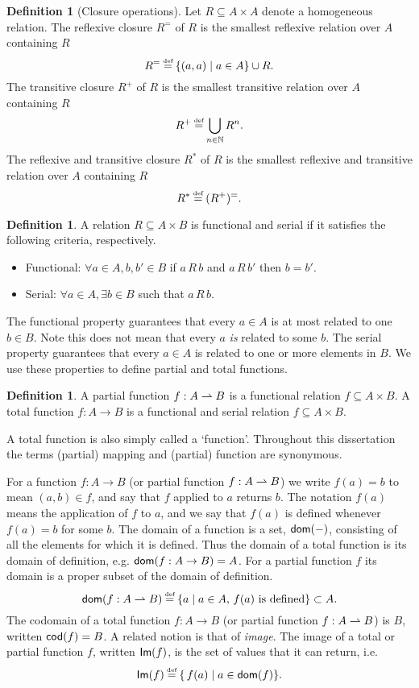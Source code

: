 \documentclass[12pt,phd,lfcs,twoside,openright,logo,leftchapter,normalheadings]{infthesis}
\theoremstyle{plain}
\theoremstyle{definition}
\newtheorem{definition}[theorem]{Definition}
\begin{document}
\begin{definition}[Closure operations]
  Let $R \subseteq A \times A$ denote a homogeneous relation. The
  reflexive closure $R^{=}$ of $R$ is the smallest reflexive relation
  over $A$ containing $R$
  \[
    R^{=} \defas \{ (a, a) \mid a \in A \} \cup R.
  \]
  The transitive closure $R^+$ of $R$ is the smallest transitive
  relation over $A$ containing $R$
  \[
    R^+ \defas \displaystyle\bigcup_{n \in \N} R^n.
  \]
  The reflexive and transitive closure $R^\ast$ of $R$ is the smallest
  reflexive and transitive relation over $A$ containing $R$
  \[
    R^\ast \defas (R^+)^{=}.
  \]
\end{definition}
%

\begin{definition}
  A relation $R \subseteq A \times B$ is functional and serial if it
  satisfies the following criteria, respectively.
  \begin{itemize}
    \item Functional: $\forall a \in A, b,b' \in B$ if  $a\,R\,b$ and $a\,R\,b'$ then $b = b'$.
    \item Serial: $\forall a \in A,\exists b \in B$ such that
      $a\,R\,b$.
  \end{itemize}
\end{definition}
%
The functional property guarantees that every $a \in A$ is at most
related to one $b \in B$. Note this does not mean that every $a$
\emph{is} related to some $b$. The serial property guarantees that
every $a \in A$ is related to one or more elements in $B$.
%
We use these properties to define partial and total functions.
%
\begin{definition}
  A partial function $f : A \rightharpoonup B$ is a functional relation
  $f \subseteq A \times B$.
  A total function $f : A \to B$ is a functional and serial relation
  $f \subseteq A \times B$.
\end{definition}
%
A total function is also simply called a `function'. Throughout this
dissertation the terms (partial) mapping and (partial) function are
synonymous.
%

For a function $f : A \to B$ (or partial function $f : A \rightharpoonup B$) we
write $f(a) = b$ to mean $(a, b) \in f$, and say that $f$ applied to
$a$ returns $b$. The notation $f(a)$ means the application of $f$ to
$a$, and we say that $f(a)$ is defined whenever $f(a) = b$ for some
$b$.
%
The domain of a function is a set, $\mathsf{dom}(-)$, consisting of all the
elements for which it is defined. Thus the domain of a total function
is its domain of definition, e.g. $\mathsf{dom}(f : A \to B) = A$.
%
For a partial function $f$ its domain is a proper subset of the domain
of definition.
%
\[
  \dom(f : A \pto B) \defas \{ a \mid a \in A,\, f(a) \text{ is defined} \} \subset A.
\]
%
The codomain of a total function $f : A \to B$ (or partial function
$f : A \rightharpoonup B$) is $B$, written $\mathsf{cod}(f) = B$. A related notion
is that of \emph{image}. The image of a total or partial function $f$,
written $\mathsf{Im}(f)$, is the set of values that it can return, i.e.
%
\[
    \dec{Im}(f) \defas \{\, f(a) \mid a \in \dom(f) \}.
\]
\end{document}
